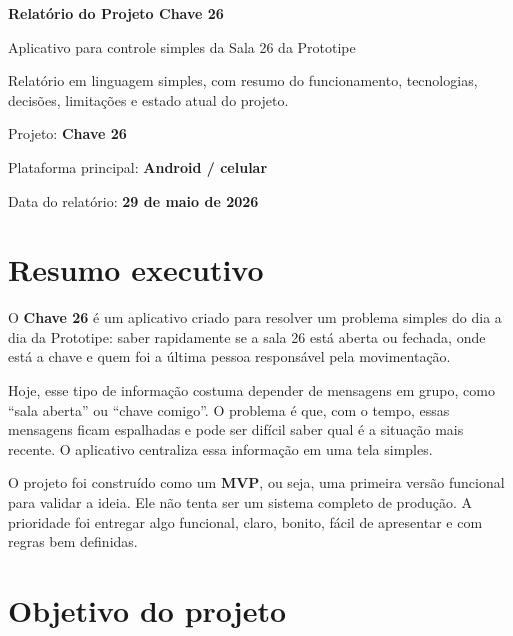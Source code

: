\documentclass[12pt,a4paper]{article}
\begin{document}
\begin{titlepage}
    \centering
    \vspace*{2cm}

    {\Huge\bfseries\color{prototipeMarinho} Relatório do Projeto Chave 26\par}
    \vspace{0.7cm}
    {\Large Aplicativo para controle simples da Sala 26 da Prototipe\par}
    \vspace{1.5cm}

    {\large Relatório em linguagem simples, com resumo do funcionamento, tecnologias, decisões, limitações e estado atual do projeto.\par}

    \vfill

    {\large Projeto: \textbf{Chave 26}\par}
    {\large Plataforma principal: \textbf{Android / celular}\par}
    {\large Data do relatório: \textbf{29 de maio de 2026}\par}

    \vspace*{1.5cm}
\end{titlepage}

\tableofcontents
\newpage

\section{Resumo executivo}

O \textbf{Chave 26} é um aplicativo criado para resolver um problema simples do dia a dia da Prototipe: saber rapidamente se a sala 26 está aberta ou fechada, onde está a chave e quem foi a última pessoa responsável pela movimentação.

Hoje, esse tipo de informação costuma depender de mensagens em grupo, como ``sala aberta'' ou ``chave comigo''. O problema é que, com o tempo, essas mensagens ficam espalhadas e pode ser difícil saber qual é a situação mais recente. O aplicativo centraliza essa informação em uma tela simples.

O projeto foi construído como um \textbf{MVP}, ou seja, uma primeira versão funcional para validar a ideia. Ele não tenta ser um sistema completo de produção. A prioridade foi entregar algo funcional, claro, bonito, fácil de apresentar e com regras bem definidas.

\section{Objetivo do projeto}
\end{document}
